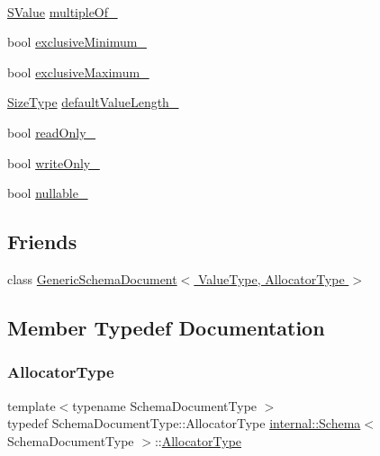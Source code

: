 \begin{DoxyCompactItemize}
$$\item 
\hyperlink{classinternal_1_1Schema_ab3a07540a27d4cc2b0e260290c5c5771}{S\+Value} \hyperlink{classinternal_1_1Schema_af016f3427aaec08d588229bd83a56339}{multiple\+Of\+\_\+}
\item 
bool \hyperlink{classinternal_1_1Schema_a1b7d339fa1a476e34ac8d22da8bac654}{exclusive\+Minimum\+\_\+}
\item 
bool \hyperlink{classinternal_1_1Schema_a06adaa450915074920fad46362f7fe5f}{exclusive\+Maximum\+\_\+}
\item 
\hyperlink{rapidjson_8h_a5ed6e6e67250fadbd041127e6386dcb5}{Size\+Type} \hyperlink{classinternal_1_1Schema_a81be31a924b213b0d3a74aa9483f7fb1}{default\+Value\+Length\+\_\+}
\item 
bool \hyperlink{classinternal_1_1Schema_a342717a1ca95f8aebf72ca067975025c}{read\+Only\+\_\+}
\item 
bool \hyperlink{classinternal_1_1Schema_aff30879c91a7bb2c8913db4cec568023}{write\+Only\+\_\+}
\item 
bool \hyperlink{classinternal_1_1Schema_a1184415e116f1b9486fb12eea446f6ef}{nullable\+\_\+}
\end{DoxyCompactItemize}
\subsection*{Friends}
\begin{DoxyCompactItemize}
\item 
class \hyperlink{classinternal_1_1Schema_a04f1d1acd0a5a7fda069c115970d52b3}{Generic\+Schema\+Document$<$ Value\+Type, Allocator\+Type $>$}
\end{DoxyCompactItemize}


\subsection{Member Typedef Documentation}
\mbox{\label{classinternal_1_1Schema_a7af392edd81e610754cd2e6b4f82761c}} 
\subsubsection{\texorpdfstring{Allocator\+Type}{AllocatorType}}
{\footnotesize\ttfamily template$<$typename Schema\+Document\+Type $>$ \\
typedef Schema\+Document\+Type\+::\+Allocator\+Type \hyperlink{classinternal_1_1Schema}{internal\+::\+Schema}$<$ Schema\+Document\+Type $>$\+::\hyperlink{classinternal_1_1Schema_a7af392edd81e610754cd2e6b4f82761c}{Allocator\+Type}}

